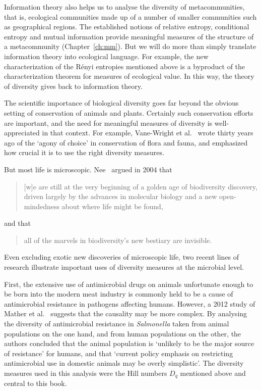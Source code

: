 Information theory also helps us to analyse the diversity of
metacommunities, that is, ecological communities made
up of a number of smaller communities such as geographical regions.  The
established notions of relative entropy, conditional entropy and mutual
information provide meaningful measures of the structure of a metacommunity
(Chapter~\ref{ch:mm}).  But we will do more than simply translate
information theory into ecological language.  For example, the new
characterization of the R\'enyi entropies mentioned above is a byproduct of
the characterization theorem for measures of ecological value.  In this
way, the theory of diversity gives back to information theory.

\introbreak

The scientific importance of biological diversity goes far beyond the
obvious setting of conservation of animals and plants.
Certainly such conservation efforts are important, and the need for
meaningful measures of diversity is well-appreciated in that context.  For
example, Vane-Wright%
%
% 
et al.~\cite{VWHW} wrote thirty years ago of the `agony of choice'
in conservation of flora and fauna, and emphasized how crucial it is to use
the right diversity measures.

But most life is microscopic.  Nee~\cite{NeeMTM}%
%
% 
argued in 2004 that
% 
\begin{quote}
{}[w]e are still at the very beginning of a golden age of biodiversity
discovery, driven largely by the advances in molecular biology and a new
open-mindedness about where life might be found,%
%
\end{quote}
% 
and that
% 
\begin{quote}
all of the marvels in biodiversity's new bestiary are invisible.
\end{quote}
% 
Even excluding exotic new discoveries of microscopic life, two recent lines
of research illustrate important uses of diversity measures at the
microbial level.

First, the extensive use of antimicrobial drugs on animals
unfortunate enough to be born into the modern meat industry is commonly
held to be a cause of antimicrobial resistance in pathogens affecting
humans.  However, a 2012 study of Mather%
%
% 
et al.~\cite{MMMR} suggests that the causality may be more complex.  By
analysing the diversity of antimicrobial%
%
%
% 
resistance in \emph{Salmonella} taken from animal populations on the one
hand, and from human populations on the other, the authors concluded that
the animal population is `unlikely to be the major source of resistance'
for humans, and that `current policy emphasis on restricting antimicrobial
use in domestic animals may be overly simplistic'.  The diversity measures
used in this analysis were the Hill numbers $D_q$ mentioned above and
central to this book.

